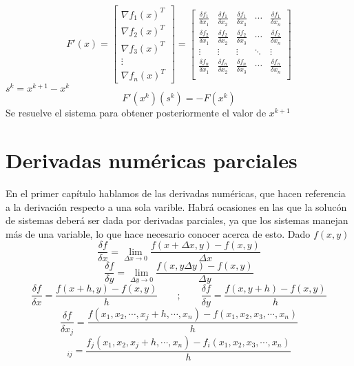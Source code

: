 \begin{displaymath}
F'(x)=\begin{bmatrix}
\nabla f_1(x)^T \\
\nabla f_2(x)^T \\
\nabla f_3(x)^T \\
\vdots \\
\nabla f_n(x)^T
\end{bmatrix}=\begin{bmatrix}
\frac{\delta f_1}{\delta x_1} & \frac{\delta f_1}{\delta x_2} & \frac{\delta f_1}{\delta x_3} & \cdots & \frac{\delta f_1}{\delta x_n} \\
\frac{\delta f_2}{\delta x_1} & \frac{\delta f_2}{\delta x_2} & \frac{\delta f_2}{\delta x_3} & \cdots & \frac{\delta f_2}{\delta x_n} \\
\vdots & \vdots & \vdots & \ddots & \vdots \\ \frac{\delta f_n}{\delta x_1} & \frac{\delta f_n}{\delta x_2} & \frac{\delta f_n}{\delta x_3} & \cdots & \frac{\delta f_n}{\delta x_n} \\
\end{bmatrix}
\end{displaymath}
$s^k=x^{k+1}-x^k$\\
\begin{displaymath}
F'(x^k)(s^k)=-F(x^k)
\end{displaymath}
Se resuelve el sistema para obtener posteriormente el valor de $x^{k+1}$

\chapter{Derivadas num\'ericas parciales}
En el primer cap\'itulo hablamos de las derivadas num\'ericas, que hacen referencia a la derivaci\'on respecto a una sola varible. Habr\'a ocasiones en las que la soluc\'on de sistemas deber\'a ser dada por derivadas parciales, ya que los sistemas manejan m\'as de una variable, lo que hace necesario conocer acerca de esto.
Dado $f(x,y)$
\begin{displaymath}
\frac{\delta f}{\delta x}=\lim_{\Delta x \to 0} \frac{f(x+\Delta x, y)-f(x,y)}{\Delta x}
\end{displaymath}
\begin{displaymath}
\frac{\delta f}{\delta y}=\lim_{\Delta y \to 0} \frac{f(x, y\Delta y)-f(x,y)}{\Delta y}
\end{displaymath}
\begin{displaymath}
\frac{\delta f}{\delta x}=\frac{f(x+h, y)-f(x,y)}{h} \qquad ; \qquad \frac{\delta f}{\delta y}=\frac{f(x, y+h)-f(x,y)}{h}
\end{displaymath}
\begin{displaymath}
\frac{\delta f}{\delta x_j}=\frac{f(x_1, x_2, \cdots , x_j+h, \cdots , x_n)-f(x_1,x_2,x_3, \cdots ,x_n)}{h}
\end{displaymath}
\begin{displaymath}
[F'(x)]_{ij}=\frac{f_j(x_1,x_2,x_j+h,\cdots ,x_n)-f_i(x_1, x_2, x_3,\cdots ,x_n)}{h}
\end{displaymath}

